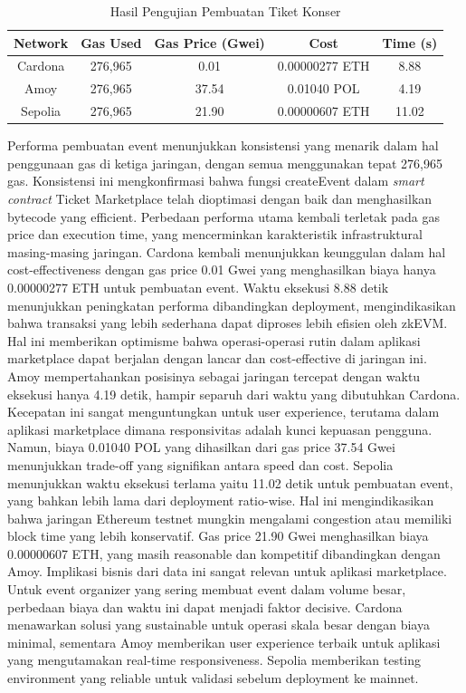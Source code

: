 \begin{table}[h]
  \centering
  \begin{tabular}{|c|c|c|c|c|}
    \hline
    \textbf{Network} & \textbf{Gas Used} & \textbf{Gas Price (Gwei)} & \textbf{Cost}  & \textbf{Time (s)} \\
    \hline
    Cardona          & 276,965           & 0.01                      & 0.00000277 ETH & 8.88              \\
    Amoy             & 276,965           & 37.54                     & 0.01040 POL    & 4.19              \\
    Sepolia          & 276,965           & 21.90                     & 0.00000607 ETH & 11.02             \\
    \hline
  \end{tabular}
  \caption{Hasil Pengujian Pembuatan Tiket Konser}
\end{table}
Performa pembuatan event menunjukkan konsistensi yang menarik dalam hal penggunaan gas di ketiga jaringan, dengan semua menggunakan tepat 276,965 gas. Konsistensi ini mengkonfirmasi bahwa fungsi createEvent dalam \emph{smart contract} Ticket Marketplace telah dioptimasi dengan baik dan menghasilkan bytecode yang efficient. Perbedaan performa utama kembali terletak pada gas price dan execution time, yang mencerminkan karakteristik infrastruktural masing-masing jaringan.
Cardona kembali menunjukkan keunggulan dalam hal cost-effectiveness dengan gas price 0.01 Gwei yang menghasilkan biaya hanya 0.00000277 ETH untuk pembuatan event. Waktu eksekusi 8.88 detik menunjukkan peningkatan performa dibandingkan deployment, mengindikasikan bahwa transaksi yang lebih sederhana dapat diproses lebih efisien oleh zkEVM. Hal ini memberikan optimisme bahwa operasi-operasi rutin dalam aplikasi marketplace dapat berjalan dengan lancar dan cost-effective di jaringan ini.
Amoy mempertahankan posisinya sebagai jaringan tercepat dengan waktu eksekusi hanya 4.19 detik, hampir separuh dari waktu yang dibutuhkan Cardona. Kecepatan ini sangat menguntungkan untuk user experience, terutama dalam aplikasi marketplace dimana responsivitas adalah kunci kepuasan pengguna. Namun, biaya 0.01040 POL yang dihasilkan dari gas price 37.54 Gwei menunjukkan trade-off yang signifikan antara speed dan cost.
Sepolia menunjukkan waktu eksekusi terlama yaitu 11.02 detik untuk pembuatan event, yang bahkan lebih lama dari deployment ratio-wise. Hal ini mengindikasikan bahwa jaringan Ethereum testnet mungkin mengalami congestion atau memiliki block time yang lebih konservatif. Gas price 21.90 Gwei menghasilkan biaya 0.00000607 ETH, yang masih reasonable dan kompetitif dibandingkan dengan Amoy.
Implikasi bisnis dari data ini sangat relevan untuk aplikasi marketplace. Untuk event organizer yang sering membuat event dalam volume besar, perbedaan biaya dan waktu ini dapat menjadi faktor decisive. Cardona menawarkan solusi yang sustainable untuk operasi skala besar dengan biaya minimal, sementara Amoy memberikan user experience terbaik untuk aplikasi yang mengutamakan real-time responsiveness. Sepolia memberikan testing environment yang reliable untuk validasi sebelum deployment ke mainnet.


